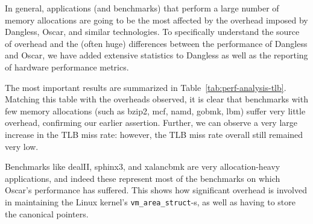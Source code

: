 In general, applications (and benchmarks) that perform a large number of memory allocations are going to be the most affected by the overhead imposed by Dangless, Oscar, and similar technologies. To specifically understand the source of overhead and the (often huge) differences between the performance of Dangless and Oscar, we have added extensive statistics to Dangless as well as the reporting of hardware performance metrics.

The most important results are summarized in Table~\ref{tab:perf-analysis-tlb}. Matching this table with the overheads observed, it is clear that benchmarks with few memory allocations (such as bzip2, mcf, namd, gobmk, lbm) suffer very little overhead, confirming our earlier assertion. Further, we can observe a very large increase in the TLB miss rate: however, the TLB miss rate overall still remained very low.

Benchmarks like dealII, sphinx3, and xalancbmk are very allocation-heavy applications, and indeed these represent most of the benchmarks on which Oscar's performance has suffered. This shows how significant overhead is involved in maintaining the Linux kernel's \lstinline!vm_area_struct!-s, as well as having to store the canonical pointers.

